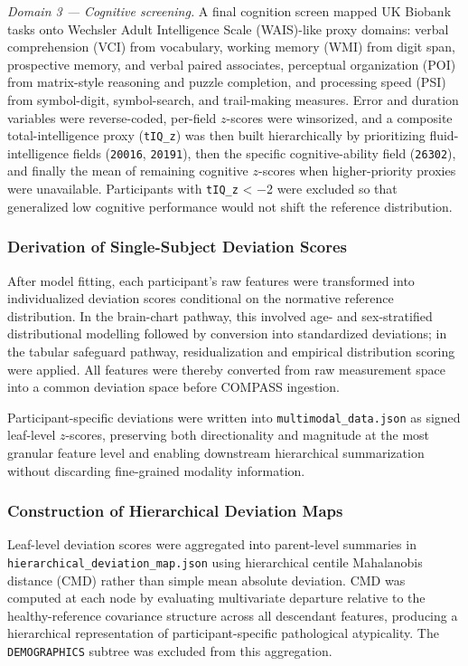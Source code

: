 \documentclass[11pt,a4paper,twoside]{article}
\begin{document}
\textit{Domain 3 --- Cognitive screening.} A final cognition screen mapped UK Biobank tasks onto Wechsler Adult Intelligence Scale (WAIS)-like proxy domains: verbal comprehension (VCI) from vocabulary, working memory (WMI) from digit span, prospective memory, and verbal paired associates, perceptual organization (POI) from matrix-style reasoning and puzzle completion, and processing speed (PSI) from symbol-digit, symbol-search, and trail-making measures. Error and duration variables were reverse-coded, per-field $z$-scores were winsorized, and a composite total-intelligence proxy (\texttt{tIQ\_z}) was then built hierarchically by prioritizing fluid-intelligence fields (\texttt{20016}, \texttt{20191}), then the specific cognitive-ability field (\texttt{26302}), and finally the mean of remaining cognitive $z$-scores when higher-priority proxies were unavailable. Participants with \texttt{tIQ\_z} < $-$2 were excluded so that generalized low cognitive performance would not shift the reference distribution.

\subsubsection{Derivation of Single-Subject Deviation Scores}
After model fitting, each participant's raw features were transformed into individualized deviation scores conditional on the normative reference distribution. In the brain-chart pathway, this involved age- and sex-stratified distributional modelling followed by conversion into standardized deviations; in the tabular safeguard pathway, residualization and empirical distribution scoring were applied. All features were thereby converted from raw measurement space into a common deviation space before COMPASS ingestion.

Participant-specific deviations were written into \texttt{multimodal\_{\allowbreak}data.{\allowbreak}json} as signed leaf-level $z$-scores, preserving both directionality and magnitude at the most granular feature level and enabling downstream hierarchical summarization without discarding fine-grained modality information.

\subsubsection{Construction of Hierarchical Deviation Maps}
Leaf-level deviation scores were aggregated into parent-level summaries in \texttt{hierarchical\_{\allowbreak}deviation\_{\allowbreak}map.{\allowbreak}json} using hierarchical centile Mahalanobis distance (CMD) rather than simple mean absolute deviation. CMD was computed at each node by evaluating multivariate departure relative to the healthy-reference covariance structure across all descendant features, producing a hierarchical representation of participant-specific pathological atypicality. The \texttt{DEMOGRAPHICS} subtree was excluded from this aggregation.
\end{document}

